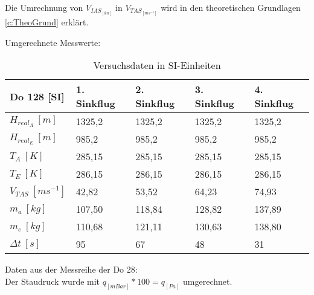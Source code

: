 Die Umrechnung von $V_{IAS_{[kn]}}$ in $V_{TAS_{[ms^{-1}]}}$ wird in den theoretischen Grundlagen \ref{c:TheoGrund} erklärt.

Umgerechnete Messwerte:

\begin{table}[h]
	\centering
	\begin{tabular}{| l | l | l | l | l | }
\hline
	Do 128 [SI] & 1. Sinkflug & 2. Sinkflug & 3. Sinkflug & 4. Sinkflug \\ \hline
	$H_{real_A}\ [m]$ & 1325,2 & 1325,2 & 1325,2 & 1325,2 \\ \hline
	$H_{real_E}\ [m]$  & 985,2 & 985,2 & 985,2 & 985,2 \\ \hline
	$T_A\ [K]$  & 285,15 & 285,15 & 285,15 & 285,15 \\ \hline
	$T_E\ [K]$  &  286,15 & 286,15 & 286,15 & 286,15 \\ \hline
	$V_{TAS}\ [ms^{-1}]$ & 42,82 & 53,52 & 64,23 & 74,93 \\ \hline
	$m_a\ [kg]$ & 107,50 & 118,84 & 128,82 & 137,89 \\ \hline
	$m_e\ [kg]$ & 110,68 & 121,11 & 130,63 & 138,80 \\ \hline
	$\Delta t\ [s]$ & 95 & 67 & 48 & 31 \\ \hline
\end{tabular}
	\caption{Versuchsdaten in SI-Einheiten}
	\label{tab:VersuchDaten3}
\end{table}

Daten aus der Messreihe der Do 28:\\
Der Staudruck wurde mit $q_{[mBar]}*100=q_{[Pa]}$ umgerechnet.\\

